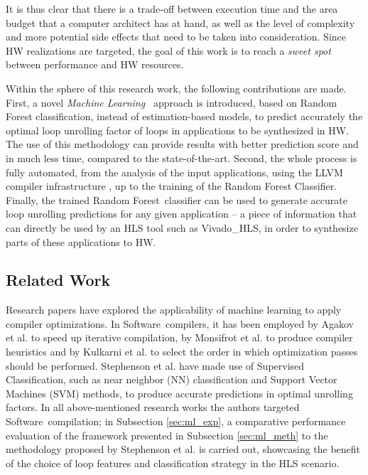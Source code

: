 \documentclass[]{usiinfthesis}
\newcommand{\SW}{{Software}}
\newcommand{\SoTA}{{state-of-the-art}}
\newcommand{\ML}{{Machine Learning}}
\newcommand{\RF}{{Random Forest}}
\begin{document}
It is thus clear that there is a trade-off between execution time and the area budget that 
a computer architect has at hand, as well as the level of complexity and more potential 
side effects that need to be taken into consideration. Since HW realizations are targeted, 
the goal of this work is to reach a {\em sweet spot} between performance and HW resources.\par

Within the sphere of this research work, the following contributions are made.
First, a novel {\em \ML\ }
approach is introduced, based on Random Forest classification, 
instead of estimation-based models, to predict 
accurately the optimal loop unrolling factor of loops in applications to be synthesized
in HW. The use of this methodology can provide results with better prediction score
and in much less time, compared to the \SoTA.
Second, the whole process is fully automated, from the analysis of the input applications, 
using the LLVM compiler infrastructure \cite{LattnerMar04}, up to the training of the Random 
Forest Classifier. Finally, the trained \RF\ classifier can be used to generate accurate loop 
unrolling predictions for any given application -- a piece of information that can 
directly be used by an HLS tool such as Vivado\_HLS, in order to synthesize parts of these 
applications to HW.

\subsection{Related Work}

Research papers have explored the applicability of machine learning to apply
compiler optimizations. In \SW\ compilers, it has been
employed by Agakov et al. \cite{AgakovMar06} to speed up iterative compilation,
by Monsifrot et al. \cite{MonsifrotAug02} to produce compiler heuristics
and by Kulkarni et al. \cite{KulkarniOct12} to select the order in which optimization passes
should be performed. Stephenson et al. \cite{StephensonApr05} have made use of Supervised 
Classification, such as near neighbor (NN) classification 
and Support Vector Machines (SVM) methods, to produce accurate predictions in optimal unrolling 
factors.
In all above-mentioned research works the authors targeted \SW\ 
compilation; in Subsection \ref{sec:ml_exp}, a comparative performance evaluation of the 
framework presented in Subsection \ref{sec:ml_meth} to the methodology proposed by 
Stephenson et al. is carried out, showcasing the benefit of the choice of loop features and 
classification strategy in the HLS scenario.\par
\end{document}
